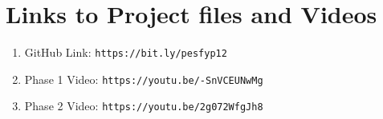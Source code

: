 \chapter{Links to Project files and Videos}

\begin{enumerate}
\item GitHub Link: {\normalsize \texttt{https://bit.ly/pesfyp12}}
\item Phase 1 Video: {\normalsize \texttt{https://youtu.be/-SnVCEUNwMg}}
\item Phase 2 Video: {\normalsize \texttt{https://youtu.be/2g072WfgJh8}}
\end{enumerate}
 